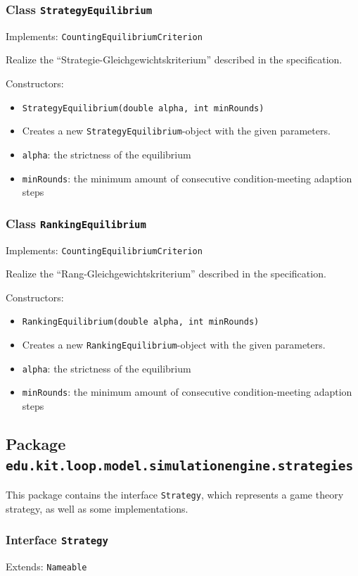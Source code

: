 \documentclass[parskip=full,11pt]{scrartcl}
\begin{document}
\subsubsection{Class \texttt{StrategyEquilibrium}}
Implements: \texttt{CountingEquilibriumCriterion}

Realize the \enquote{Strategie-Gleichgewichtskriterium} described in the specification.

Constructors:
\begin{itemize}\itemsep -10pt
\item \texttt{StrategyEquilibrium(double alpha, int minRounds)}
\item[] Creates a new \texttt{StrategyEquilibrium}-object with the given parameters.
\item[] \texttt{alpha}: the strictness of the equilibrium
\item[] \texttt{minRounds}: the minimum amount of consecutive condition-meeting adaption steps
\end{itemize}

\subsubsection{Class \texttt{RankingEquilibrium}}
Implements: \texttt{CountingEquilibriumCriterion}

Realize the \enquote{Rang-Gleichgewichtskriterium} described in the specification.

Constructors:
\begin{itemize}\itemsep -10pt
\item \texttt{RankingEquilibrium(double alpha, int minRounds)}
\item[] Creates a new \texttt{RankingEquilibrium}-object with the given parameters.
\item[] \texttt{alpha}: the strictness of the equilibrium
\item[] \texttt{minRounds}: the minimum amount of consecutive condition-meeting adaption steps
\end{itemize}

\subsection{Package \texttt{edu.kit.loop.model.simulationengine.strategies}}
This package contains the interface \texttt{Strategy}, which represents a game theory strategy, as well as some implementations.


\subsubsection{Interface \texttt{Strategy}}
Extends: \texttt{Nameable}
\end{document}
